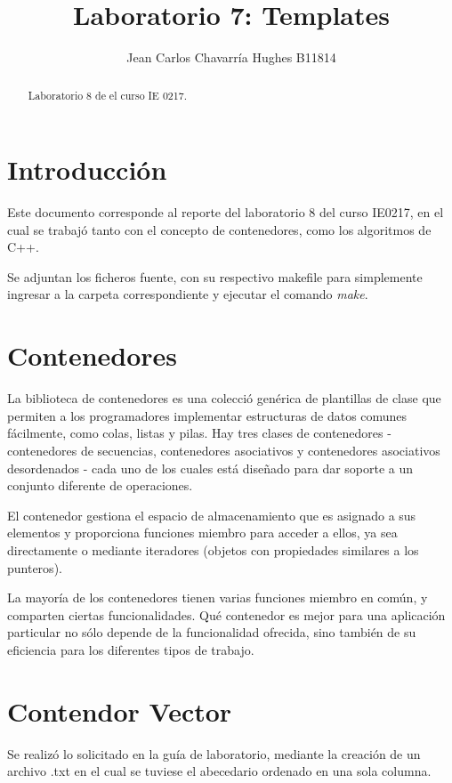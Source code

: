 \documentclass{article}
\begin{document}
\title{Laboratorio 7: Templates}
\author{Jean Carlos Chavarr\' ia Hughes B11814}
\maketitle
\begin{abstract}
Laboratorio 8 de el curso IE 0217.
\end{abstract}
\section{Introducci\' on}
Este documento corresponde al reporte del laboratorio 8 del curso IE0217, en el cual se trabaj\' o tanto con el concepto de contenedores, como los algoritmos de C++.

Se adjuntan los ficheros fuente, con su respectivo makefile para simplemente ingresar a la carpeta correspondiente y ejecutar el comando \textit{make}.

\section{Contenedores}
La biblioteca de contenedores es una colecci\' o gen\' erica de plantillas de clase que permiten a los programadores implementar estructuras de datos comunes f\' acilmente, como colas, listas y pilas. Hay tres clases de contenedores - contenedores de secuencias, contenedores asociativos y contenedores asociativos desordenados - cada uno de los cuales est\' a dise\~ nado para dar soporte a un conjunto diferente de operaciones.

El contenedor gestiona el espacio de almacenamiento que es asignado a sus elementos y proporciona funciones miembro para acceder a ellos, ya sea directamente o mediante iteradores (objetos con propiedades similares a los punteros).

La mayor\' ia de los contenedores tienen varias funciones miembro en com\' un, y comparten ciertas funcionalidades. Qu\' e contenedor es mejor para una aplicaci\' on particular no s\' olo depende de la funcionalidad ofrecida, sino tambi\' en de su eficiencia para los diferentes tipos de trabajo. 

\section{Contendor Vector}
Se realiz\' o lo solicitado en la gu\' ia de laboratorio, mediante la creaci\' on de un archivo .txt en el cual se tuviese el abecedario ordenado en una sola columna. 
\end{document}
